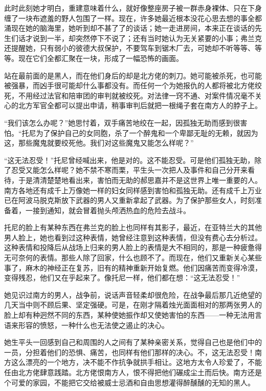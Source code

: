\par 此时此刻她才明白，重建意味着什么，就好像整座房子被一群赤身裸体、只在下身缠了一块布遮羞的野人包围了一样。现在，许多她最近根本没花心思去想的事全都涌现在她的脑海里，她听到却不甚了了的谈话；她一走进房间，本来正在谈话的先生们话才说到一半，却突然停下不说了；还有当时她认为无关紧要的小事；弗兰克还提醒她，只有弱小的彼德大叔保护，不要驾车到锯木厂去，可她却不听等等、等等。现在它们全都汇聚在一块，形成了一幅恐怖的画面。
\par 站在最前面的是黑人，而在他们身后的却是北方佬的刺刀。她可能被杀死，也可能被强暴，而凶手很可能却什么事都没有。而任何一个为她报仇的人都将被北方佬绞死，不用经过法官和陪审团的审判就被绞死。对法律一窍不通、对案件情况毫不关心的北方军官全都可以提出申请，稍事审判后就把一根绳子套在南方人的脖子上。
\par “我们该怎么办呢？”她思忖着，双手痛苦地绞在一起，因孤独无助而感到很害怕。“托尼为了保护自己的女同胞，杀了一个醉鬼和一个卑鄙无耻的无赖，就因为这，那些魔鬼就要绞死他。我们对这些魔鬼又能怎么样呢？”
\par “这无法忍受！”托尼曾经喊出来，他是对的。这不能忍受。可是他们孤独无助，除了忍受又能怎么样呢？她不禁不寒而栗，平生头一次把人及事件和自己分开来看待，于是清清楚楚地看出来，害怕而无助的郝思嘉并不是这世界上唯一重要的人。南方各地还有成千上万像她一样的妇女同样感到害怕和孤独无助。还有成千上万业已在阿波马脱克斯放下武器的男人又重新拿起了武器。为了保护那些女人，时刻准备着，一接到通知，就会冒着抛头颅洒热血的危险去战斗。
\par 托尼的脸上有某种东西在弗兰克的脸上也同样有其影子，最近，在亚特兰大的其他男人脸上，她也看到过这种表情，她曾经注意到这种表情，但没有费心去分析过。这种表情和投降后从战场上归来的男人脸上的表情是大不相同的，那是一种疲惫得无可奈何的表情。那些人除了回家，什么也顾不了。而现在，他们又重新关心某些事了，麻木的神经正在复苏，旧有的精神重新开始复燃。他们因痛苦而变得冷漠，变得残忍，他们又在乎起来了。像托尼一样，他们都在想：“这无法忍受！”
\par 她见识过南方的男人，战争前，说话声音轻柔却很危险，在战争最后那几近绝望的几天当中则不顾后果、坚定强硬。可是，在刚才隔着烛光面面相对的那两张男人的脸上却有种迥然不同的东西，某种使她振作却又使她害怕的东西——一种无法用言语来形容的愤怒，一种什么也无法使之遏止的决心。
\par 她生平头一回感到自己和周围的人之间有了某种亲密关系，觉得自己也是他们中的一员，分担着他们的恐惧、痛苦，也同样有他们那样的决心。不，这无法忍受！南方这么漂亮的一个地方，决不能不作抗争就拱手相让。这地方太令人珍爱了，不能任由北方佬肆意践踏。北方佬恨南方人，恨不得把他们碾成尘土而后快。南方还是个可爱的家园，不能把它交给被威士忌酒和自由思想灌得醉醺醺的无知的黑人。
